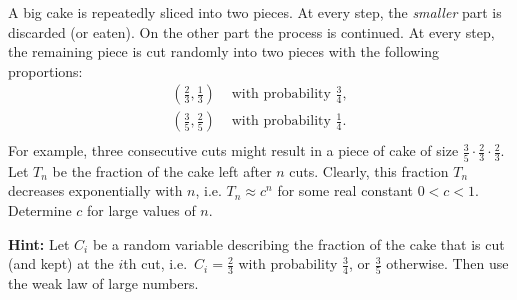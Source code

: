 \documentclass[a4paper,10pt,landscape,twocolumn]{scrartcl}
\begin{document}
\begin{exercise}
A big cake is repeatedly sliced into two pieces. At every step, the \emph{smaller} part is discarded (or eaten). On the other part the process is continued. At every step, the remaining piece is cut randomly into two pieces with the following proportions:
\begin{align*}
\left(\frac{2}{3},\frac{1}{3}\right) &\mbox{ with probability } \frac{3}{4},\\
\left(\frac{3}{5},\frac{2}{5}\right) &\mbox{ with probability } \frac{1}{4}.\\
\end{align*}
For example, three consecutive cuts might result in a piece of cake of size $\frac{3}{5} \cdot \frac{2}{3} \cdot \frac{2}{3}$. Let $T_n$ be the fraction of the cake left after $n$ cuts. Clearly, this fraction $T_n$ decreases exponentially with $n$, i.e. $T_n \approx c^n$ for some real constant $0<c<1$. Determine $c$ for large values of $n$.

\textbf{Hint:} Let $C_i$ be a random variable describing the fraction of the cake that is cut (and kept) at the $i$th cut, i.e.\ $C_i = \frac{2}{3}$ with probability $\frac{3}{4}$, or $\frac{3}{5}$ otherwise.  Then use the weak law of large numbers.





\end{exercise}
\end{document}
